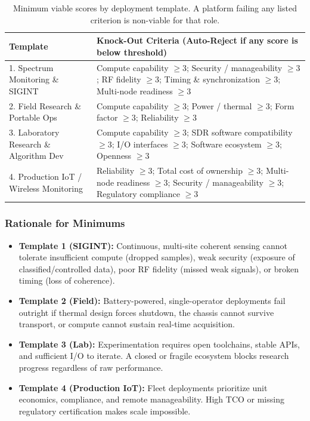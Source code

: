 \documentclass[11pt,a4paper]{article}
\begin{document}
\begin{table}[H]
  \centering
  \small
  \begin{tabular}{@{}p{}p{}@{}}
    \toprule
    Template & Knock-Out Criteria (Auto-Reject if any score is below threshold) \\
    \midrule
    1. Spectrum Monitoring \& SIGINT & Compute capability $\geq 3$; Security / manageability $\geq 3$; RF fidelity $\geq 3$; Timing \& synchronization $\geq 3$; Multi-node readiness $\geq 3$ \\
    2. Field Research \& Portable Ops & Compute capability $\geq 3$; Power / thermal $\geq 3$; Form factor $\geq 3$; Reliability $\geq 3$ \\
    3. Laboratory Research \& Algorithm Dev & Compute capability $\geq 3$; SDR software compatibility $\geq 3$; I/O interfaces $\geq 3$; Software ecosystem $\geq 3$; Openness $\geq 3$ \\
    4. Production IoT / Wireless Monitoring & Reliability $\geq 3$; Total cost of ownership $\geq 3$; Multi-node readiness $\geq 3$; Security / manageability $\geq 3$; Regulatory compliance $\geq 3$ \\
    \bottomrule
  \end{tabular}
  \caption{Minimum viable scores by deployment template. A platform failing any listed criterion is non-viable for that role.}
  \label{tab:knockout-thresholds}
\end{table}

\subsubsection*{Rationale for Minimums}

\begin{itemize}
  \item \textbf{Template 1 (SIGINT):} Continuous, multi-site coherent sensing cannot tolerate insufficient compute (dropped samples), weak security (exposure of classified/controlled data), poor RF fidelity (missed weak signals), or broken timing (loss of coherence).
  \item \textbf{Template 2 (Field):} Battery-powered, single-operator deployments fail outright if thermal design forces shutdown, the chassis cannot survive transport, or compute cannot sustain real-time acquisition.
  \item \textbf{Template 3 (Lab):} Experimentation requires open toolchains, stable APIs, and sufficient I/O to iterate. A closed or fragile ecosystem blocks research progress regardless of raw performance.
  \item \textbf{Template 4 (Production IoT):} Fleet deployments prioritize unit economics, compliance, and remote manageability. High TCO or missing regulatory certification makes scale impossible.
\end{itemize}
\end{document}
